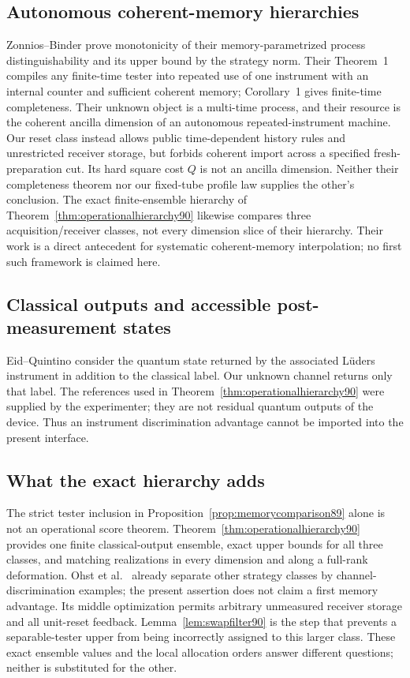 \subsection{Autonomous coherent-memory hierarchies}
Zonnios--Binder \cite[Proposition~2]{ZB90} prove monotonicity of their
memory-parametrized process distinguishability and its upper bound by
the strategy norm.  Their Theorem~1 compiles any finite-time tester into
repeated use of one instrument with an internal counter and sufficient
coherent memory; Corollary~1 gives finite-time completeness.  Their
unknown object is a multi-time process, and their resource is the coherent
ancilla dimension of an autonomous repeated-instrument machine.
Our reset class instead allows public time-dependent history rules and
unrestricted receiver storage, but forbids coherent import across a
specified fresh-preparation cut.  Its hard square cost $Q$ is not an
ancilla dimension.  Neither their completeness theorem nor our fixed-tube
profile law supplies the other's conclusion.  The exact finite-ensemble
hierarchy of Theorem~\ref{thm:operationalhierarchy90} likewise compares
three acquisition/receiver classes, not every dimension slice of their
hierarchy.  Their work is a direct antecedent for systematic coherent-memory
interpolation; no first such framework is claimed here.

\subsection{Classical outputs and accessible post-measurement states}
Eid--Quintino \cite{EQ90} consider the quantum state returned by the
associated L\"uders instrument in addition to the classical label.
Our unknown channel returns only that label.  The references used in
Theorem~\ref{thm:operationalhierarchy90} were supplied by the experimenter;
they are not residual quantum outputs of the device.  Thus an instrument
discrimination advantage cannot be imported into the present interface.

\subsection{What the exact hierarchy adds}
The strict tester inclusion in Proposition~\ref{prop:memorycomparison89}
alone is not an operational score theorem.  Theorem~\ref{thm:operationalhierarchy90}
provides one finite classical-output ensemble, exact upper bounds for all
three classes, and matching realizations in every dimension and along a
full-rank deformation.  Ohst et al.\ \cite[Theorem~24]{OZNPQ89} already
separate other strategy classes by channel-discrimination examples; the
present assertion does not claim a first memory advantage.  Its middle
optimization permits arbitrary unmeasured receiver storage and all
unit-reset feedback.  Lemma~\ref{lem:swapfilter90} is the step that prevents
a separable-tester upper from being incorrectly assigned to this larger
class.  These exact ensemble values and the local allocation orders
answer different questions; neither is substituted for the other.
